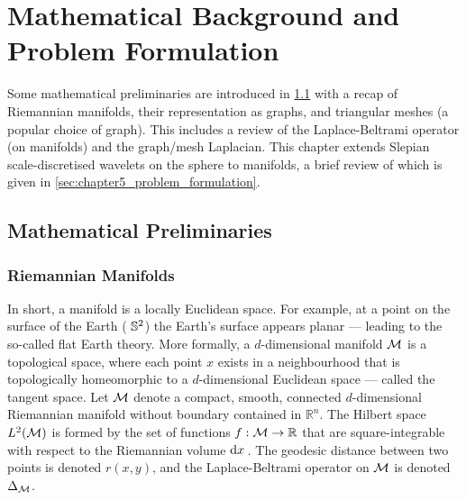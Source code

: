 \section{Mathematical Background and Problem Formulation}\label{sec:chapter5_mathematical_background_problem_formulation}

Some mathematical preliminaries are introduced in \cref{sec:chapter5_mathematical_preliminaries} with a recap of Riemannian manifolds, their representation as graphs, and triangular meshes (a popular choice of graph).
This includes a review of the Laplace-Beltrami operator (on manifolds) and the graph/mesh Laplacian.
This chapter extends Slepian scale-discretised wavelets on the sphere to manifolds, a brief review of which is given in \cref{sec:chapter5_problem_formulation}.

\subsection{Mathematical Preliminaries}\label{sec:chapter5_mathematical_preliminaries}

\subsubsection{Riemannian Manifolds}

In short, a manifold is a locally Euclidean space.
For example, at a point on the surface of the Earth (\ie{} \(\mathbb{S}^{2}{}\)) the Earth's surface appears planar --- leading to the so-called flat Earth theory.
More formally, a \(d\)-dimensional manifold \(\mathcal{M}{}\) is a topological space, where each point \(x\) exists in a neighbourhood that is topologically homeomorphic to a \(d\)-dimensional Euclidean space --- called the tangent space.
Let \(\mathcal{M}{}\) denote a compact, smooth, connected \(d\)-dimensional Riemannian manifold without boundary contained in \(\mathbb{R}^{n}\).
The Hilbert space \(L^{2}(\mathcal{M})\) is formed by the set of functions \(f : \mathcal{M} \to \mathbb{R}\) that are square-integrable with respect to the Riemannian volume \(\dd{x}{}\).
The geodesic distance between two points is denoted \(r(x,y)\), and the Laplace-Beltrami operator on \(\mathcal{M}{}\) is denoted \(\Delta_{\mathcal{M}}\).

